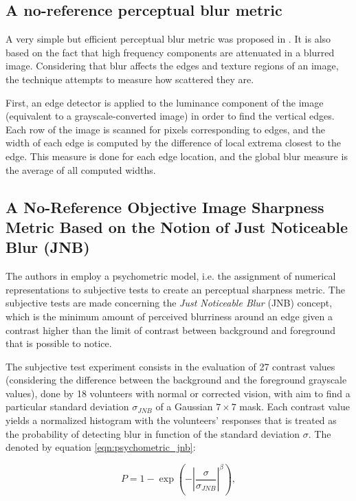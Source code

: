 \subsection{A no-reference perceptual blur metric}

A very simple but efficient perceptual blur metric was proposed in
\cite{marziliano2002noreference}. It is also based on the fact that high frequency components are attenuated in a blurred image. Considering that blur affects the edges and texture regions of an image, the technique attempts to measure how scattered they are. 

First, an edge detector is applied to the luminance component of the image (equivalent to a grayscale-converted image) in order to find the vertical edges. Each row of the image is scanned for pixels corresponding to edges, and the width of each edge is computed by the difference of local extrema closest to the edge. This measure is done for each edge location, and the global blur measure is the average of all computed widths.

\subsection{A No-Reference Objective Image Sharpness Metric Based on the Notion of Just Noticeable Blur (JNB)}
\label{subsec:jnb_approach}

The authors in \cite{ferzli2009noreference} employ a psychometric model, i.e. the assignment of numerical representations to subjective tests to create an perceptual sharpness metric. The subjective tests are made concerning the \emph{Just Noticeable Blur} (JNB) concept, which is the minimum amount of perceived blurriness around an edge given a contrast higher than the limit of contrast between background and foreground that is possible to notice. 

The subjective test experiment consists in the evaluation of 27 contrast values (considering the difference between the background and the foreground grayscale values), done by 18 volunteers with normal or corrected vision, with aim to find a particular standard deviation $\sigma_{JNB}$ of a Gaussian $7 \times 7$ mask. Each contrast value yields a normalized histogram with the volunteers' responses that is treated as the probability of detecting blur in function of the standard deviation $\sigma$. The denoted by equation \ref{eqn:psychometric_jnb}:

\begin{equation}
\label{eqn:psychometric_jnb}
P = 1 - \exp{\left( - \left| \frac{\sigma}{\sigma_{JNB} } \right|^{\beta} \right)},
\end{equation}

